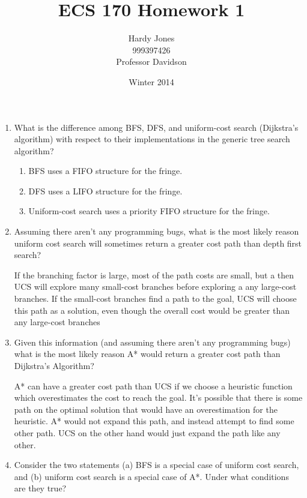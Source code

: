 \documentclass[12pt,letterpaper]{article}
\title{ECS 170 Homework 1\vspace{-2ex}}
\author{Hardy Jones\\
        999397426\\
        Professor Davidson\vspace{-2ex}}
\date{Winter 2014}
\begin{document}
  \maketitle

  \begin{enumerate}
    \item
      What is the difference among
      BFS, DFS, and uniform-cost search (Dijkstra's algorithm)
      with respect to their implementations in the generic tree search algorithm?

      \begin{enumerate}
        \item BFS uses a FIFO structure for the fringe.
        \item DFS uses a LIFO structure for the fringe.
        \item Uniform-cost search uses a priority FIFO structure for the fringe.
      \end{enumerate}
    \item
      Assuming there aren't any programming bugs,
      what is the most likely reason uniform cost search will sometimes return a greater cost path than depth first search?

      If the branching factor is large, most of the path costs are small, but a
      then UCS will explore many small-cost branches before exploring a any large-cost branches.
      If the small-cost branches find a path to the goal,
      UCS will choose this path as a solution,
      even though the overall cost would be greater than any large-cost branches
    \item
      Given this information (and assuming there aren't any programming bugs)
      what is the most likely reason A* would return a greater cost path
      than Dijkstra's Algorithm?

      A* can have a greater cost path than UCS
      if we choose a heuristic function which overestimates the cost to reach the goal.
      It's possible that there is some path on the optimal solution
      that would have an overestimation for the heuristic.
      A* would not expand this path,
      and instead attempt to find some other path.
      UCS on the other hand would just expand the path like any other.

    \item
      Consider the two statements
      (a) BFS is a special case of uniform cost search, and
      (b) uniform cost search is a special case of A*.
      Under what conditions are they true?


\end{enumerate}
\end{document}
